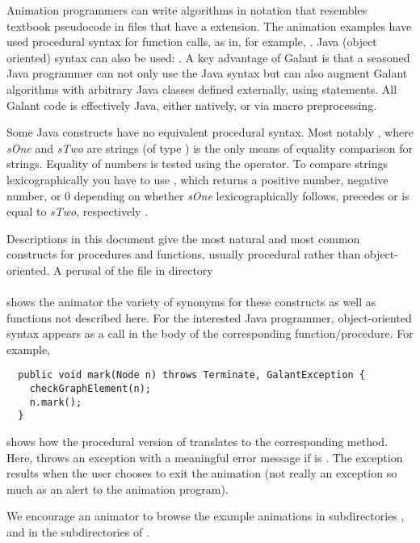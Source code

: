 Animation programmers can write algorithms in notation that resembles
textbook pseudocode
in files that have a  extension.
The animation examples have used procedural syntax for function calls, as in, for example,
.
Java (object oriented) syntax can also be used: .
A key advantage of Galant is that a seasoned Java programmer can
not only use the Java syntax but can also augment Galant algorithms with
arbitrary Java classes defined externally, using  statements.
All Galant code is effectively Java, either natively, or via macro
preprocessing.

Some Java constructs have no equivalent procedural syntax. Most notably
, where \emph{sOne} and
\emph{sTwo} are strings (of type ) is the only means of
equality comparison for strings. Equality of numbers is tested using the
\Code{==} operator.
To compare strings lexicographically you have to use
, which returns a positive
number, negative number, or 0 depending on whether \emph{sOne}
lexicographically follows,
precedes or is equal to \emph{sTwo}, respectively .

Descriptions in this document give the most natural and most common
constructs for procedures and functions, usually procedural rather
than object-oriented.
A perusal of the file  in directory\\ 
\hspace*{1em}\\
shows the animator the variety of
synonyms for these constructs
as well as functions not described here. For the interested Java programmer,
object-oriented syntax appears as a call in the body of the corresponding
function/procedure. For example,
\begin{verbatim}
  public void mark(Node n) throws Terminate, GalantException {
    checkGraphElement(n);
    n.mark();
  }
\end{verbatim}
shows how the procedural version of  translates to the
corresponding  method. Here,  throws an
exception with a meaningful error message if  is .
The  exception results when the user chooses to exit the
animation (not really an exception so much as an alert to the animation
program).

We encourage an animator to browse the example animations in subdirectories
,  and in the subdirectories of .

